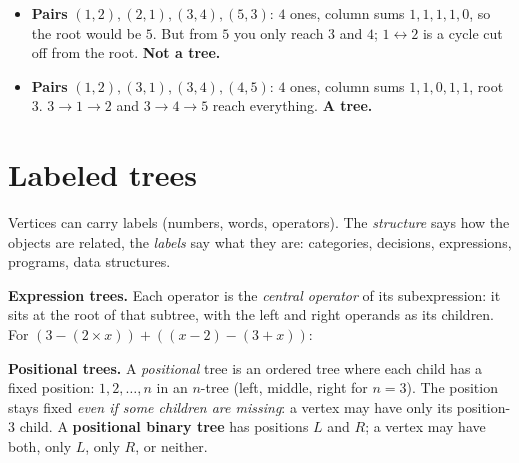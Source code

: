 \documentclass{fkt-notes}
\newcommand{\src}[1]{\par\noindent{\small\itshape Source: #1}\par\smallskip}
\newcommand{\kolman}[1]{\setcounter{section}{\numexpr#1-1\relax}}
\theoremstyle{definition}
\begin{document}
\begin{example}
  \begin{itemize}[nosep]
    \item \textbf{Pairs} $(1,2), (2,1), (3,4), (5,3)$: $4$ ones, column
          sums $1,1,1,1,0$, so the root would be $5$. But from $5$ you
          only reach $3$ and $4$; $1 \leftrightarrow 2$ is a cycle cut
          off from the root. \textbf{Not a tree.}
    \item \textbf{Pairs} $(1,2), (3,1), (3,4), (4,5)$: $4$ ones, column
          sums $1,1,0,1,1$, root $3$. $3 \to 1 \to 2$ and
          $3 \to 4 \to 5$ reach everything. \textbf{A tree.}
  \end{itemize}
\end{example}

\kolman{2}
\section{Labeled trees}\src{Kolman 7.2}
%

Vertices can carry labels (numbers, words, operators). The \emph{structure}
says how the objects are related, the \emph{labels} say what they are:
categories, decisions, expressions, programs, data structures.

\textbf{Expression trees.} Each operator is the \emph{central operator} of
its subexpression: it sits at the root of that subtree, with the left and
right operands as its children. For $(3-(2\times x))+((x-2)-(3+x))$:
\begin{center}
\end{center}

\textbf{Positional trees.} A \emph{positional} tree is an ordered tree
where each child has a fixed position: $1,2,\dots,n$ in an $n$-tree (left,
middle, right for $n=3$). The position stays fixed \emph{even if some
  children are missing}: a vertex may have only its position-$3$ child. A
\textbf{positional binary tree} has positions $L$ and $R$; a vertex may
have both, only $L$, only $R$, or neither.
\end{document}
